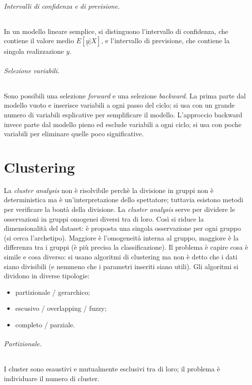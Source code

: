 \documentclass[11pt, a4page, twocolumn]{article}
\begin{document}
\paragraph{Intervalli di confidenza e di previsione.}
In un modello lineare semplice, si distinguono l'intervallo di confidenza, che contiene il valore medio $E[\underline{y} | X]$, e l'intervallo di previsione, che contiene la singola realizzazione $y$.

\paragraph{Selezione variabili.}
Sono possibili una selezione \textit{forward} e una selezione \textit{backward}.
La prima parte dal modello vuoto e inserisce variabili a ogni passo del ciclo; si usa con un grande numero di variabili esplicative per semplificare il modello.
L'approccio backward invece parte dal modello pieno ed esclude variabili a ogni ciclo; si usa con poche variabili per eliminare quelle poco significative.

\newpage
\part{Clustering}
La \textit{cluster analysis} non è risolvibile perchè la divisione in gruppi non è deterministica ma è un'interpretazione dello spettatore; tuttavia esistono metodi per verificare la bontà della divisione.
La \textit{cluster analysis} serve per dividere le osservazioni in gruppi omogenei diversi tra di loro.
Così si riduce la dimensionalità del dataset: è proposta una singola osservazione per ogni gruppo (si cerca l'archetipo).
Maggiore è l'omogeneità interna al gruppo, maggiore è la differenza tra i gruppi (è più precisa la classificazione). \newline
Il problema è capire cosa è simile e cosa diverso: si usano algoritmi di clustering ma non è detto che i dati siano divisibili (e nemmeno che i parametri inseriti siano utili).
Gli algoritmi si dividono in diverse tipologie:
\begin{itemize}
\item partizionale / gerarchico;
\item escusivo / overlapping / fuzzy;
\item completo / parziale.
\end{itemize}
\paragraph{Partizionale.}
I cluster sono esaustivi e mutualmente esclusivi tra di loro; il problema è individuare il numero di cluster.
\end{document}
